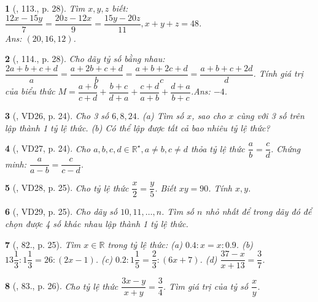 \documentclass{article}
\newtheorem{baitoan}{}
\begin{document}
\begin{baitoan}[\cite{Tuyen_Toan_7}, 113., p. 28]
	Tìm $x,y,z$ biết: $\dfrac{12x - 15y}{7} = \dfrac{20z - 12x}{9} = \dfrac{15y - 20z}{11},x + y + z = 48$.\\\mbox{}\hfill{\sf Ans:} $(20,16,12)$.
\end{baitoan}

\begin{baitoan}[\cite{Tuyen_Toan_7}, 114., p. 28]
	Cho dãy tỷ số bằng nhau: $\dfrac{2a + b + c + d}{a} = \dfrac{a + 2b + c + d}{b} = \dfrac{a + b + 2c + d}{c} = \dfrac{a + b + c + 2d}{d}$. Tính giá trị của biểu thức $M = \dfrac{a + b}{c + d} + \dfrac{b + c}{d + a} + \dfrac{c + d}{a + b} + \dfrac{d + a}{b + c}$.\hfill{\sf Ans:} $-4$.
\end{baitoan}

\begin{baitoan}[\cite{Binh_Toan_7_tap_1}, VD26, p. 24]
	Cho 3 số $6,8,24$. (a) Tìm số $x$, sao cho $x$ cùng với 3 số trên lập thành 1 tỷ lệ thức. (b) Có thể lập được tất cả bao nhiêu tỷ lệ thức?
\end{baitoan}

\begin{baitoan}[\cite{Binh_Toan_7_tap_1}, VD27, p. 24]
	Cho $a,b,c,d\in\mathbb{R}^\star,a\ne b,c\ne d$ thỏa tỷ lệ thức $\dfrac{a}{b} = \dfrac{c}{d}$. Chứng minh: $\dfrac{a}{a - b} = \dfrac{c}{c - d}$.
\end{baitoan}

\begin{baitoan}[\cite{Binh_Toan_7_tap_1}, VD28, p. 25]
	Cho tỷ lệ thức $\dfrac{x}{2} = \dfrac{y}{5}$. Biết $xy = 90$. Tính $x,y$.
\end{baitoan}

\begin{baitoan}[\cite{Binh_Toan_7_tap_1}, VD29, p. 25]
	Cho dãy số $10,11,\ldots,n$. Tìm số $n$ nhỏ nhất để trong dãy đó để chọn được 4 số khác nhau lập thành 1 tỷ lệ thức.
\end{baitoan}

\begin{baitoan}[\cite{Binh_Toan_7_tap_1}, 82., p. 25]
	Tìm $x\in\mathbb{R}$ trong tỷ lệ thức: (a) $0.4:x = x:0.9$. (b) $13\dfrac{1}{3}:1\dfrac{1}{3} = 26:(2x - 1)$. (c) $0.2:1\dfrac{1}{5} = \dfrac{2}{3}:(6x + 7)$. (d) $\dfrac{37 - x}{x + 13} = \dfrac{3}{7}$.	
\end{baitoan}

\begin{baitoan}[\cite{Binh_Toan_7_tap_1}, 83., p. 26]
	Cho tỷ lệ thức $\dfrac{3x - y}{x + y} = \dfrac{3}{4}$. Tìm giá trị của tỷ số $\dfrac{x}{y}$.
\end{baitoan}
\end{document}
